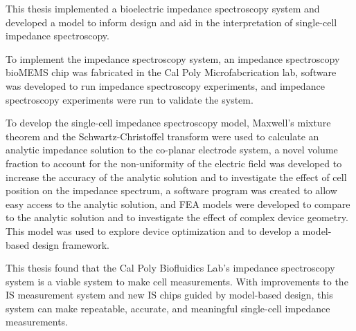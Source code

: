 
\par This thesis implemented a bioelectric impedance spectroscopy system and developed a model to inform design and aid in the interpretation of single-cell impedance spectroscopy.
\par To implement the impedance spectroscopy system, an impedance spectroscopy bioMEMS chip was fabricated in the Cal Poly Microfabcrication lab, software was developed to run impedance spectroscopy experiments, and impedance spectroscopy experiments were run to validate the system. 
\par To develop the single-cell impedance spectroscopy model, Maxwell's mixture theorem and the Schwartz-Christoffel transform were used to calculate an analytic impedance solution to the co-planar electrode system, a novel volume fraction to account for the non-uniformity of the electric field was developed to increase the accuracy of the analytic solution and to investigate the effect of cell position on the impedance spectrum, a software program was created to allow easy access to the analytic solution, and FEA models were developed to compare to the analytic solution and to investigate the effect of complex device geometry. This model was used to explore device optimization and to develop a model-based design framework.

\par This thesis found that the Cal Poly Biofluidics Lab's impedance spectroscopy system is a viable system to make cell measurements. With improvements to the IS measurement system and new IS chips guided by model-based design, this system can make repeatable, accurate, and meaningful single-cell impedance measurements.

